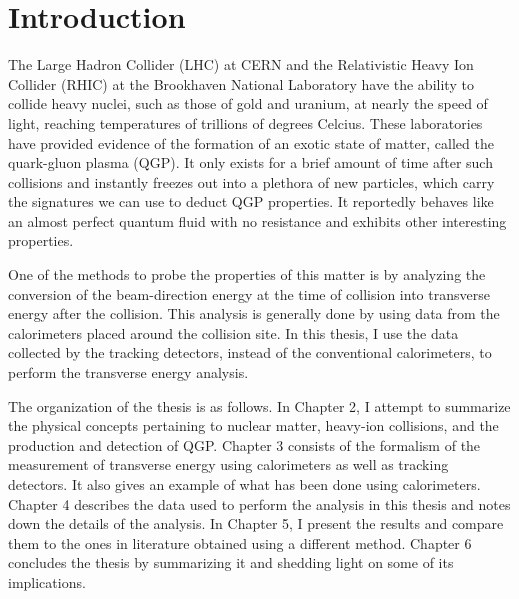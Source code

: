 \chapter{Introduction} \label{ch:introduction}

The Large Hadron Collider (LHC) at CERN and the Relativistic Heavy Ion Collider (RHIC) at the Brookhaven National Laboratory have the ability to collide heavy nuclei, such as those of gold and uranium, at nearly the speed of light, reaching temperatures of trillions of degrees Celcius. These laboratories have provided evidence of the formation of an exotic state of matter, called the quark-gluon plasma (QGP). It only exists for a brief amount of time after such collisions and instantly freezes out into a plethora of new particles, which carry the signatures we can use to deduct QGP properties. It reportedly behaves like an almost perfect quantum fluid with no resistance and exhibits other interesting properties.

One of the methods to probe the properties of this matter is by analyzing the conversion of the beam-direction energy at the time of collision into transverse energy after the collision. This analysis is generally done by using data from the calorimeters placed around the collision site. In this thesis, I use the data collected by the tracking detectors, instead of the conventional calorimeters, to perform the transverse energy analysis.

The organization of the thesis is as follows. In Chapter 2, I attempt to summarize the physical concepts pertaining to nuclear matter, heavy-ion collisions, and the production and detection of QGP. Chapter 3 consists of the formalism of the measurement of transverse energy using calorimeters as well as tracking detectors. It also gives an example of what has been done using calorimeters. Chapter 4 describes the data used to perform the analysis in this thesis and notes down the details of the analysis. In Chapter 5, I present the results and compare them to the ones in literature obtained using a different method. Chapter 6 concludes the thesis by summarizing it and shedding light on some of its implications.
